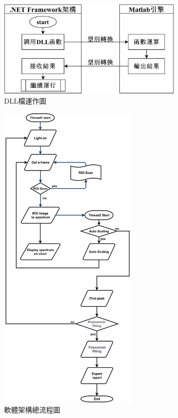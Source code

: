 \begin{figure}[H] %
	\vspace{0.8cm}
	\centering %
	\setlength{\abovecaptionskip}{1cm}
	\includegraphics[width=0.8\textwidth]{figures/DLL.png} %
	\caption{DLL檔運作圖} %
	\label{DLL檔運作圖} %
\end{figure}
\newpage
\begin{figure}[H] %
	\centering %
    \setlength{\abovecaptionskip}{1cm}
	\includegraphics[width=0.6\textwidth]{figures/總流程圖.png} %
	\caption{軟體架構總流程圖} %
	\label{程式架構總體流程圖} %
\end{figure}
\newpage
